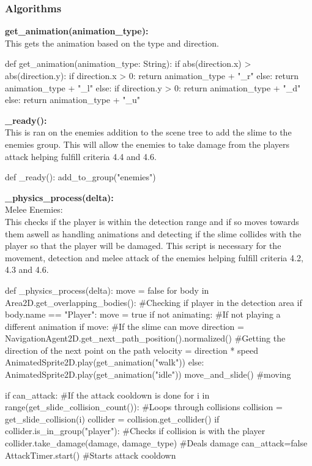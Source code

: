 \documentclass{article}
\begin{document}
        \subsubsection{Algorithms}
        \textbf{get\_animation(animation\_type):}\\
        This gets the animation based on the type and direction.\\
        \begin{python}
def get_animation(animation_type: String):
	if abs(direction.x) > abs(direction.y):
		if direction.x > 0:
			return animation_type + "_r"
		else:
			return animation_type + "_l"
	else:
		if direction.y > 0:
			return animation_type + "_d"
		else:
			return animation_type + "_u"
        \end{python}
        \textbf{\_ready():}\\
        This is ran on the enemies addition to the scene tree to add the slime to the enemies group. This will allow the enemies to take damage from the players attack helping fulfill criteria 4.4 and 4.6.\\
        \begin{python}
def _ready():
   add_to_group("enemies")
        \end{python}
        \textbf{\_physics\_process(delta):}\\
        Melee Enemies:\\
        This checks if the player is within the detection range and if so moves towards them aswell as handling animations and detecting if the slime collides with the player so that the player will be damaged. This script is necessary for the movement, detection and melee attack of the enemies helping fulfill criteria 4.2, 4.3 and 4.6.\\
        \begin{python}
def _physics_process(delta):
   move = false
   for body in Area2D.get_overlapping_bodies(): #Checking if player in the detection area
      if body.name == "Player":
         move = true
   if not animating: #If not playing a different animation
      if move: #If the slime can move
         direction = NavigationAgent2D.get_next_path_position().normalized() #Getting the direction of the next point on the path
         velocity = direction * speed
         AnimatedSprite2D.play(get_animation("walk"))
      else:
         AnimatedSprite2D.play(get_animation("idle"))
   move_and_slide() #moving
                
   if can_attack: #If the attack cooldown is done
      for i in range(get_slide_collision_count()): #Loops through collisions
         collision = get_slide_collision(i)
         collider = collision.get_collider()
            if collider.is_in_group("player"): #Checks if collision is with the player
               collider.take_damage(damage, damage_type) #Deals damage
               can_attack=false 
               AttackTimer.start() #Starts attack cooldown
        \end{python}
\end{document}
